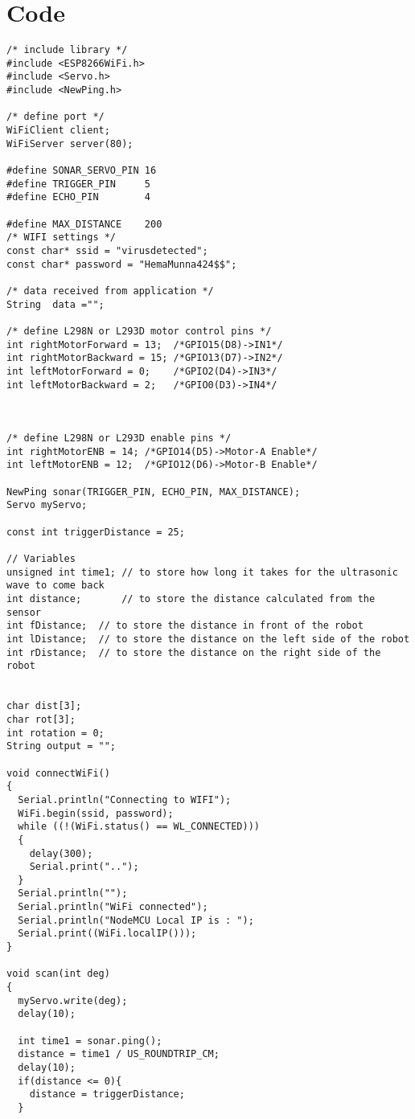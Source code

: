 \documentclass[sigconf]{acmart}
\begin{document}
\section{Code}
\begin{lstlisting}
/* include library */
#include <ESP8266WiFi.h>
#include <Servo.h> 
#include <NewPing.h>

/* define port */
WiFiClient client;
WiFiServer server(80);

#define SONAR_SERVO_PIN 16
#define TRIGGER_PIN     5
#define ECHO_PIN        4

#define MAX_DISTANCE    200
/* WIFI settings */
const char* ssid = "virusdetected";
const char* password = "HemaMunna424$$";

/* data received from application */
String  data =""; 

/* define L298N or L293D motor control pins */
int rightMotorForward = 13;  /*GPIO15(D8)->IN1*/
int rightMotorBackward = 15; /*GPIO13(D7)->IN2*/
int leftMotorForward = 0;    /*GPIO2(D4)->IN3*/
int leftMotorBackward = 2;   /*GPIO0(D3)->IN4*/



/* define L298N or L293D enable pins */
int rightMotorENB = 14; /*GPIO14(D5)->Motor-A Enable*/
int leftMotorENB = 12;  /*GPIO12(D6)->Motor-B Enable*/

NewPing sonar(TRIGGER_PIN, ECHO_PIN, MAX_DISTANCE);
Servo myServo;

const int triggerDistance = 25;

// Variables
unsigned int time1; // to store how long it takes for the ultrasonic wave to come back
int distance;       // to store the distance calculated from the sensor
int fDistance;  // to store the distance in front of the robot
int lDistance;  // to store the distance on the left side of the robot
int rDistance;  // to store the distance on the right side of the robot


char dist[3];
char rot[3];
int rotation = 0;
String output = "";

void connectWiFi()
{
  Serial.println("Connecting to WIFI");
  WiFi.begin(ssid, password);
  while ((!(WiFi.status() == WL_CONNECTED)))
  {
    delay(300);
    Serial.print("..");
  }
  Serial.println("");
  Serial.println("WiFi connected");
  Serial.println("NodeMCU Local IP is : ");
  Serial.print((WiFi.localIP()));
}

void scan(int deg)
{
  myServo.write(deg);
  delay(10);

  int time1 = sonar.ping();
  distance = time1 / US_ROUNDTRIP_CM;
  delay(10);
  if(distance <= 0){
    distance = triggerDistance;
  }


\end{lstlisting}
\end{document}
